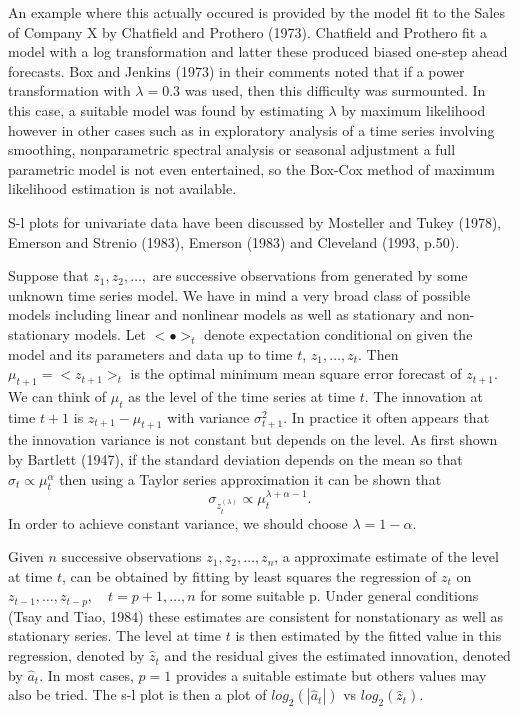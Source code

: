 An example where this actually occured is provided by the
model fit to the Sales of Company X by Chatfield and Prothero (1973).
Chatfield and Prothero fit a model with a log transformation and
latter these produced biased one-step ahead forecasts.
Box and Jenkins (1973) in their comments noted that if a 
power transformation with $\lambda = 0.3$ was used, then this difficulty
was surmounted.
In this case, a suitable model was found by estimating $\lambda$ by maximum
likelihood however in other
cases such as in exploratory analysis of a time series involving
smoothing, nonparametric spectral analysis or seasonal adjustment a
full parametric model is not even entertained, so the Box-Cox method
of maximum likelihood estimation is not available.


S-l plots for univariate data have been discussed by 
Mosteller and Tukey (1978), Emerson and Strenio (1983),
Emerson (1983) and Cleveland (1993, p.50).

Suppose that $z_1, z_2, \ldots, $ are successive observations
from generated by some unknown time series model. 
We have in mind a very broad class of possible models including
linear and nonlinear models as well as stationary and non-stationary
models.
Let $<\bullet>_t$ denote expectation conditional on given the
model and its parameters and data up to time $t$,
$z_1, \ldots, z_t$.
Then $\mu_{t+1} = <z_{t+1}>_t$ is the optimal minimum mean square error
forecast of $z_{t+1}$.
We can think of $\mu_t$ as the level of the time series at
time $t$.
The innovation at time $t+1$ is $z_{t+1}-\mu_{t+1}$ with variance
$\sigma_{t+1}^2$.
In practice it often appears that the innovation
variance is not constant but depends on the level.
As first shown by Bartlett (1947),
if the standard deviation depends on the mean so that
$\sigma_t \propto \mu_t^\alpha$
then using a Taylor series approximation it can be shown
that
$$\sigma_{z^{(\lambda)}_t} \propto \mu_t^{\lambda+\alpha-1}.$$
In order to achieve constant variance, we should choose
$\lambda = 1-\alpha$.

Given $n$ successive observations $z_1, z_2, \ldots, z_n$,
a approximate estimate of the level at time $t$, 
can be obtained by fitting by least squares the regression
of $z_t$ on $z_{t-1}, \ldots, z_{t-p}, \quad t=p+1,\ldots,n$
for some suitable p.
Under general conditions (Tsay and Tiao, 1984) these estimates are consistent
for nonstationary as well as stationary series.
The level at time $t$ is then estimated by the fitted value in 
this regression, denoted by $\hat z_t$ and the residual gives the
estimated innovation, denoted by $\hat a_t$.
In most cases, $p=1$ provides a suitable estimate but others values
may also be tried.
The s-l plot is then a plot of $log_2(|\hat a_t|)$ vs $log_2(\hat z_t)$.

